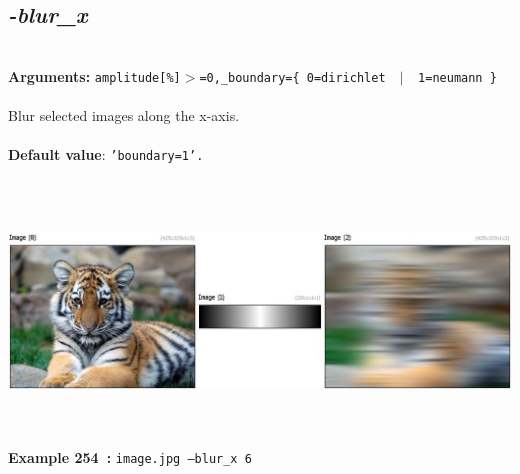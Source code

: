 \documentclass[a4paper,11pt,twoside]{book}
\begin{document}
\subsection{\emph{-blur\_x} }\vspace*{-0.5em}
~\\\textbf{Arguments: } 
{\small \texttt{amplitude[\%]$>$=0,\_boundary=\{ 0=dirichlet ~$|$~ 1=neumann \}}}\\~\\
Blur selected images along the x-axis.
~\\~\\\textbf{Default value}: {\small \texttt{'boundary=1'.}}
\begin{center}\includegraphics[keepaspectratio=true,height=7cm,width=\textwidth]{img/gmic_def254.jpg}\\
{\footnotesize \textbf{Example 254~:} \texttt{image.jpg --blur\_x 6}}
\end{center}
\end{document}
